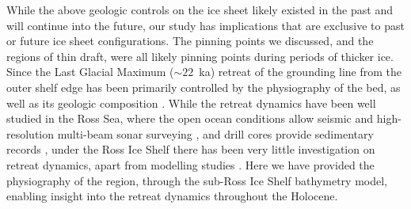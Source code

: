 While the above geologic controls on the ice sheet likely existed in the past and will continue into the future, our study has implications that are exclusive to past or future ice sheet configurations. The pinning points we discussed, and the regions of thin draft, were all likely pinning points during periods of thicker ice. Since the Last Glacial Maximum ($\sim22$~ka) retreat of the grounding line from the outer shelf edge has been primarily controlled by the physiography of the bed, as well as its geologic composition \citep{halberstadticesheet2016, andersonseismic2019}. While the retreat dynamics have been well studied in the Ross Sea, where the open ocean conditions allow seismic and high-resolution multi-beam sonar surveying \citep{halberstadticesheet2016, andersonseismic2019}, and drill cores provide sedimentary records \citep{mckayantarctic2016}, under the Ross Ice Shelf there has been very little investigation on retreat dynamics, apart from modelling studies \citep{lowrygeologic2020, kingslakeextensive2018}. Here we have provided the physiography of the region, through the sub-Ross Ice Shelf bathymetry model, enabling insight into the retreat dynamics throughout the Holocene. \\

